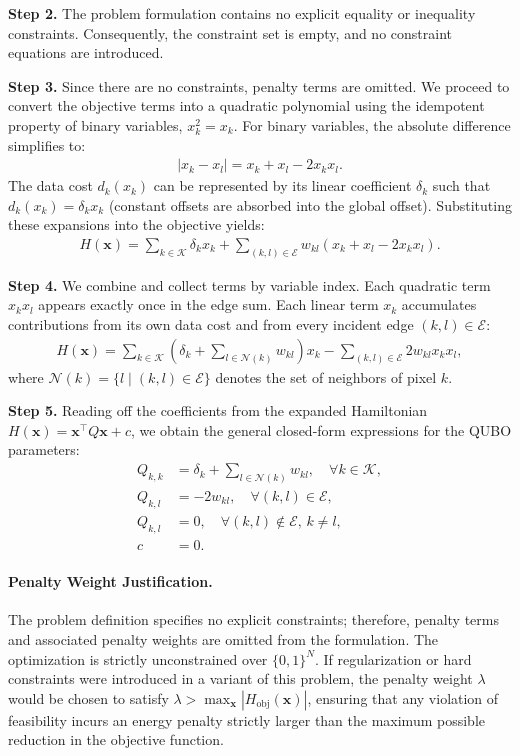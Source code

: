 \documentclass[12pt]{article}
\begin{document}
\textbf{Step 2.} The problem formulation contains no explicit equality or inequality constraints. Consequently, the constraint set is empty, and no constraint equations are introduced.

\textbf{Step 3.} Since there are no constraints, penalty terms are omitted. We proceed to convert the objective terms into a quadratic polynomial using the idempotent property of binary variables, $x_k^2 = x_k$. For binary variables, the absolute difference simplifies to:
\begin{align}
|x_k - x_l| = x_k + x_l - 2x_k x_l.
\end{align}
The data cost $d_k(x_k)$ can be represented by its linear coefficient $\delta_k$ such that $d_k(x_k) = \delta_k x_k$ (constant offsets are absorbed into the global offset). Substituting these expansions into the objective yields:
\begin{align}
H(\mathbf{x}) = \sum_{k \in \mathcal{K}} \delta_k x_k + \sum_{(k,l) \in \mathcal{E}} w_{kl} (x_k + x_l - 2x_k x_l).
\end{align}

\textbf{Step 4.} We combine and collect terms by variable index. Each quadratic term $x_k x_l$ appears exactly once in the edge sum. Each linear term $x_k$ accumulates contributions from its own data cost and from every incident edge $(k,l) \in \mathcal{E}$:
\begin{align}
H(\mathbf{x}) = \sum_{k \in \mathcal{K}} \left( \delta_k + \sum_{l \in \mathcal{N}(k)} w_{kl} \right) x_k - \sum_{(k,l) \in \mathcal{E}} 2w_{kl} x_k x_l,
\end{align}
where $\mathcal{N}(k) = \{ l \mid (k,l) \in \mathcal{E} \}$ denotes the set of neighbors of pixel $k$.

\textbf{Step 5.} Reading off the coefficients from the expanded Hamiltonian $H(\mathbf{x}) = \mathbf{x}^\top Q \mathbf{x} + c$, we obtain the general closed-form expressions for the QUBO parameters:
\begin{align}
Q_{k,k} &= \delta_k + \sum_{l \in \mathcal{N}(k)} w_{kl}, \quad \forall k \in \mathcal{K}, \\
Q_{k,l} &= -2w_{kl}, \quad \forall (k,l) \in \mathcal{E}, \\
Q_{k,l} &= 0, \quad \forall (k,l) \notin \mathcal{E}, \, k \neq l, \\
c &= 0.
\end{align}

\paragraph{Penalty Weight Justification.}
The problem definition specifies no explicit constraints; therefore, penalty terms and associated penalty weights are omitted from the formulation. The optimization is strictly unconstrained over $\{0,1\}^N$. If regularization or hard constraints were introduced in a variant of this problem, the penalty weight $\lambda$ would be chosen to satisfy $\lambda > \max_{\mathbf{x}} |H_{\text{obj}}(\mathbf{x})|$, ensuring that any violation of feasibility incurs an energy penalty strictly larger than the maximum possible reduction in the objective function.
\end{document}
